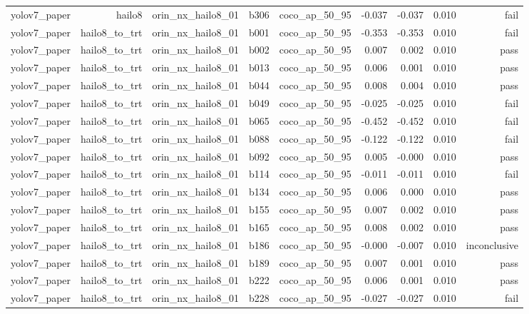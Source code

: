 \begin{table}[t]
\begin{tabular}{lrrrrrrrr}
yolov7\_paper & hailo8 & orin\_nx\_hailo8\_01 & b306 & coco\_ap\_50\_95 & -0.037 & -0.037 & 0.010 & fail \\
yolov7\_paper & hailo8\_to\_trt & orin\_nx\_hailo8\_01 & b001 & coco\_ap\_50\_95 & -0.353 & -0.353 & 0.010 & fail \\
yolov7\_paper & hailo8\_to\_trt & orin\_nx\_hailo8\_01 & b002 & coco\_ap\_50\_95 & 0.007 & 0.002 & 0.010 & pass \\
yolov7\_paper & hailo8\_to\_trt & orin\_nx\_hailo8\_01 & b013 & coco\_ap\_50\_95 & 0.006 & 0.001 & 0.010 & pass \\
yolov7\_paper & hailo8\_to\_trt & orin\_nx\_hailo8\_01 & b044 & coco\_ap\_50\_95 & 0.008 & 0.004 & 0.010 & pass \\
yolov7\_paper & hailo8\_to\_trt & orin\_nx\_hailo8\_01 & b049 & coco\_ap\_50\_95 & -0.025 & -0.025 & 0.010 & fail \\
yolov7\_paper & hailo8\_to\_trt & orin\_nx\_hailo8\_01 & b065 & coco\_ap\_50\_95 & -0.452 & -0.452 & 0.010 & fail \\
yolov7\_paper & hailo8\_to\_trt & orin\_nx\_hailo8\_01 & b088 & coco\_ap\_50\_95 & -0.122 & -0.122 & 0.010 & fail \\
yolov7\_paper & hailo8\_to\_trt & orin\_nx\_hailo8\_01 & b092 & coco\_ap\_50\_95 & 0.005 & -0.000 & 0.010 & pass \\
yolov7\_paper & hailo8\_to\_trt & orin\_nx\_hailo8\_01 & b114 & coco\_ap\_50\_95 & -0.011 & -0.011 & 0.010 & fail \\
yolov7\_paper & hailo8\_to\_trt & orin\_nx\_hailo8\_01 & b134 & coco\_ap\_50\_95 & 0.006 & 0.000 & 0.010 & pass \\
yolov7\_paper & hailo8\_to\_trt & orin\_nx\_hailo8\_01 & b155 & coco\_ap\_50\_95 & 0.007 & 0.002 & 0.010 & pass \\
yolov7\_paper & hailo8\_to\_trt & orin\_nx\_hailo8\_01 & b165 & coco\_ap\_50\_95 & 0.008 & 0.002 & 0.010 & pass \\
yolov7\_paper & hailo8\_to\_trt & orin\_nx\_hailo8\_01 & b186 & coco\_ap\_50\_95 & -0.000 & -0.007 & 0.010 & inconclusive \\
yolov7\_paper & hailo8\_to\_trt & orin\_nx\_hailo8\_01 & b189 & coco\_ap\_50\_95 & 0.007 & 0.001 & 0.010 & pass \\
yolov7\_paper & hailo8\_to\_trt & orin\_nx\_hailo8\_01 & b222 & coco\_ap\_50\_95 & 0.006 & 0.001 & 0.010 & pass \\
yolov7\_paper & hailo8\_to\_trt & orin\_nx\_hailo8\_01 & b228 & coco\_ap\_50\_95 & -0.027 & -0.027 & 0.010 & fail \\

\end{tabular}
\end{table}
